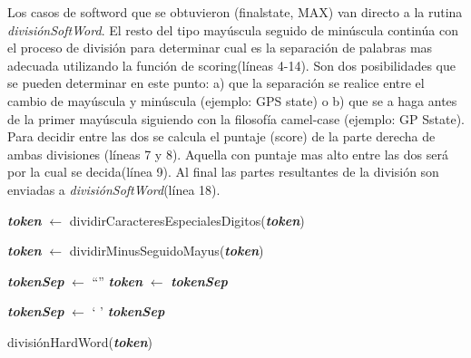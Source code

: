 \documentclass[a4paper,12pt]{report}
\begin{document}
Los casos de softword que se obtuvieron (\textsf{finalstate}, \textsf{MAX}) van directo a la rutina \mbox{\textit{divisiónSoftWord}}. El resto del tipo mayúscula seguido de minúscula continúa con el proceso de división para determinar cual es la separación de palabras mas adecuada utilizando la función de scoring(líneas 4-14). Son dos posibilidades que se pueden determinar en este punto: a) que la separación se realice entre el cambio de mayúscula y minúscula (ejemplo: \textsf{GPS state}) o b) que se a haga antes de la primer mayúscula siguiendo con la filosofía camel-case (ejemplo: \textsf{GP Sstate}). Para decidir entre las dos se calcula el puntaje (score) de la parte derecha de ambas divisiones (líneas 7 y 8). Aquella con puntaje mas alto entre las dos será por la cual se decida(línea 9). Al final las partes resultantes de la división son enviadas a \textit{divisiónSoftWord}(línea 18).

\begin{algorithm}
\LinesNumbered%
\BlankLine
\textbf{\textit{token}} $\leftarrow $ dividirCaracteresEspecialesDigitos(\textbf{\textit{token}})

\textbf{\textit{token}} $\leftarrow $ dividirMinusSeguidoMayus(\textbf{\textit{token}})

\textbf{\textit{tokenSep}} $\leftarrow $ “”
\BlankLine
{}
\BlankLine
\textbf{\textit{token}} $\leftarrow$ \textbf{\textit{tokenSep}}

\textbf{\textit{tokenSep}} $\leftarrow$ ` '
\BlankLine
{}
\BlankLine
\Return \textbf{\textit{tokenSep}}

\caption{divisiónHardWord(\textbf{\textit{token}}) \label{AHW}}
\end{algorithm}
\end{document}
